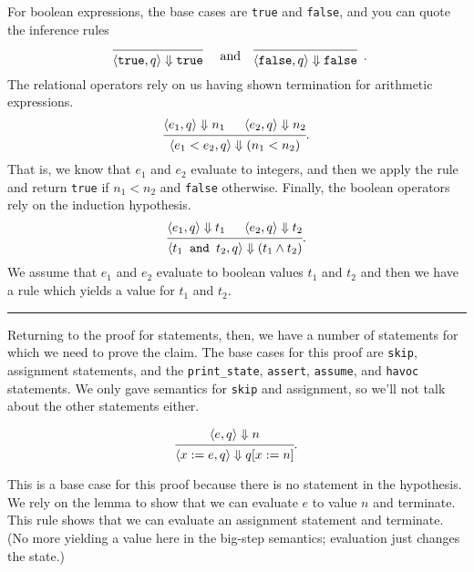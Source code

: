 \documentclass[11pt]{article}
\newcommand{\qedsymbol}{\rule{1ex}{1ex}}
\begin{document}
For boolean expressions, the base cases are \texttt{true} and \texttt{false}, and you can quote the inference
rules
\[
\begin{array}{ccc}
  \begin{prooftree}
  \infer0{\langle \texttt{true}, q \rangle \Downarrow \texttt{true}},
\end{prooftree} & \textrm{ and~~ }
\begin{prooftree}
  \infer0{\langle \texttt{false}, q \rangle \Downarrow \texttt{false}}
\end{prooftree}
\end{array}.
\]
The relational operators rely on us having shown termination for arithmetic expressions.
\[
  \begin{prooftree}
    \hypo{\langle e_1, q \rangle \Downarrow n_1}
    \hypo{\langle e_2, q \rangle \Downarrow n_2}
  \infer2{\langle e_1 < e_2, q \rangle \Downarrow (n_1 < n_2)}
  \end{prooftree}
  .
\]
That is, we know that $e_1$ and $e_2$ evaluate to integers, and then we apply the rule and return
\texttt{true} if $n_1 < n_2$ and \texttt{false} otherwise.
Finally, the boolean operators rely on the induction hypothesis.
\[
  \begin{prooftree}
    \hypo{\langle e_1, q \rangle \Downarrow t_1}
    \hypo{\langle e_2, q \rangle \Downarrow t_2}
  \infer2{\langle t_1 \texttt{~and~} t_2, q \rangle \Downarrow (t_1 \wedge t_2)}
  \end{prooftree}
  .
\]
We assume that $e_1$ and $e_2$ evaluate to boolean values $t_1$ and $t_2$ and then we have a rule which
yields a value for $t_1$ and $t_2$.~~\qedsymbol

Returning to the proof for statements, then, we have a number of statements for which we need to prove the claim.
The base cases for this proof are \texttt{skip}, assignment statements, and the \texttt{print\_state},
\texttt{assert}, \texttt{assume}, and \texttt{havoc} statements. We only gave semantics for \texttt{skip} and
assignment, so we'll not talk about the other statements either.

\[
  \begin{prooftree}
    \hypo{\langle e, q \rangle \Downarrow n}
  \infer1{\langle x := e, q \rangle \Downarrow q[x:=n]}
  \end{prooftree}
  .
\]

This is a base case for this proof because there is no statement in
the hypothesis. We rely on the lemma to show that we can evaluate $e$
to value $n$ and terminate. This rule shows that we can evaluate an
assignment statement and terminate. (No more yielding a value here in
the big-step semantics; evaluation just changes the state.)
\end{document}
